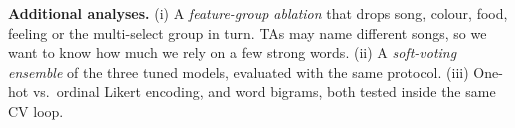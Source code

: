 \documentclass[12pt]{article}
\begin{document}
\textbf{Additional analyses.} (i) A \emph{feature-group ablation} that drops song, colour, food, feeling or the multi-select group in turn. TAs may name different songs, so we want to know how much we rely on a few strong words. (ii) A \emph{soft-voting ensemble} of the three tuned models, evaluated with the same protocol. (iii) One-hot vs.\ ordinal Likert encoding, and word bigrams, both tested inside the same CV loop.

\renewcommand{\refname}{References}


\end{document}
